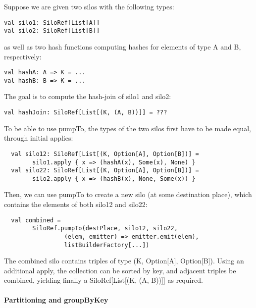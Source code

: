 \documentclass{easychair}
\begin{document}
Suppose we are given two silos with the following types:
\begin{verbatim}
val silo1: SiloRef[List[A]]
val silo2: SiloRef[List[B]]
\end{verbatim}
\noindent
as well as two hash functions computing hashes for elements of type A and B, respectively:
\begin{verbatim}
val hashA: A => K = ...
val hashB: B => K = ...
\end{verbatim}
\noindent
The goal is to compute the hash-join of silo1 and silo2:
\begin{verbatim}
val hashJoin: SiloRef[List[(K, (A, B))]] = ???
\end{verbatim}
\noindent
To be able to use pumpTo, the types of the two silos first have to be made equal, through initial applies:
\begin{verbatim}
  val silo12: SiloRef[List[(K, Option[A], Option[B])] =
        silo1.apply { x => (hashA(x), Some(x), None) }
  val silo22: SiloRef[List[(K, Option[A], Option[B])] =
        silo2.apply { x => (hashB(x), None, Some(x)) }
\end{verbatim}
\noindent
Then, we can use pumpTo to create a new silo (at some destination place), which contains the elements of both silo12 and silo22:
\begin{verbatim}
  val combined =
        SiloRef.pumpTo(destPlace, silo12, silo22,
                 (elem, emitter) => emitter.emit(elem),
                 listBuilderFactory[...])
\end{verbatim}
\noindent
The combined silo contains triples of type (K, Option[A], Option[B]). Using an
additional apply, the collection can be sorted by key, and adjacent triples be
combined, yielding finally a SiloRef[List[(K, (A, B))]] as required.

\paragraph{Partitioning and groupByKey}
\end{document}

